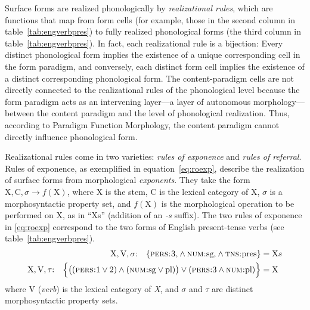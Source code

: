 Surface forms are realized phonologically by \emph{realizational rules}, which 
are functions that map from form cells (for example, those in the second column in table~\ref{tab:engverbpres})
to fully realized phonological forms (the third column in table~\ref{tab:engverbpres}). 
In fact, each realizational rule is a bijection: Every 
distinct phonological form implies the existence of a unique corresponding cell in 
the form paradigm, and conversely, each distinct form cell implies the existence of 
a distinct corresponding phonological form. The
content-paradigm cells are not directly connected to the realizational rules of 
the phonological level because the form paradigm acts as an 
intervening layer---a layer of autonomous morphology---between the 
content paradigm and the level of phonological realization. 
Thus, according to Paradigm Function Morphology, the content paradigm cannot directly influence phonological form. 

Realizational rules come in two varieties:
\emph{rules of exponence} and \emph{rules of referral}. Rules of exponence, as exemplified in equation~\eqref{eq:roexp}, describe the 
realization of surface forms from morphological \emph{exponents}. They take the form 
$\text{X},\text{C},\sigma \to f(\text{X})$, where X is the stem, C is the lexical category of X, 
$\sigma$ is a morphosyntactic property set,  and $f(\text{X})$ is the morphological operation to be performed 
on X, as in ``Xs'' (addition of an \emph{-s} suffix). The two rules of exponence in \eqref{eq:roexp}  
correspond to the two forms 
of English present-tense verbs (see table~\ref{tab:engverbpres}). 
\begin{align}
\label{eq:roexp}
	\text{X},\text{V},\sigma\text{:} \quad
	\{ \textsc{pers:3}\text{,} \land \textsc{num:}\text{sg,} \land \textsc{tns:}\text{pres} \} &= \text{X}s \\ 
	\text{X},\text{V},\tau\text{:} \quad
\Big\{ \big((\textsc{pers:}\text{1}\vee\text{2}) \land (\textsc{num:}\text{sg} \vee \text{pl})\big) 
\vee (\textsc{pers:}\text{3}\land \textsc{num:}\text{pl}) \Big\} %
&= \text{X} 
\end{align}
where $\text{V}$ (\textit{verb}) is the lexical category of \textit{X},
and $\sigma$ and $\tau$ are distinct morphosyntactic property sets. 

